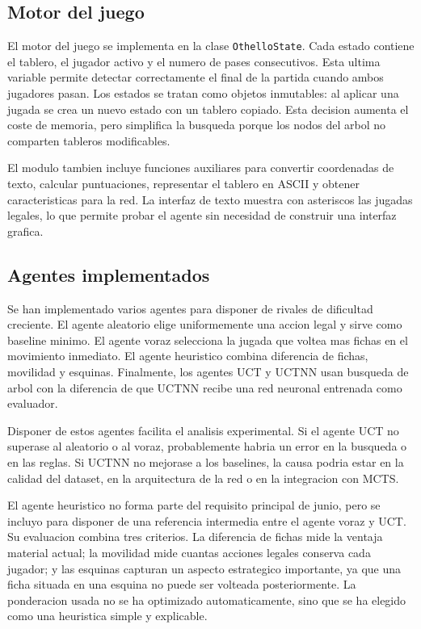 \documentclass[conference,a4paper]{IEEEtran}
\begin{document}
\subsection{Motor del juego}

El motor del juego se implementa en la clase \texttt{OthelloState}. Cada estado
contiene el tablero, el jugador activo y el numero de pases consecutivos. Esta
ultima variable permite detectar correctamente el final de la partida cuando
ambos jugadores pasan. Los estados se tratan como objetos inmutables: al aplicar
una jugada se crea un nuevo estado con un tablero copiado. Esta decision aumenta
el coste de memoria, pero simplifica la busqueda porque los nodos del arbol no
comparten tableros modificables.

El modulo tambien incluye funciones auxiliares para convertir coordenadas de
texto, calcular puntuaciones, representar el tablero en ASCII y obtener
caracteristicas para la red. La interfaz de texto muestra con asteriscos las
jugadas legales, lo que permite probar el agente sin necesidad de construir una
interfaz grafica.

\subsection{Agentes implementados}

Se han implementado varios agentes para disponer de rivales de dificultad
creciente. El agente aleatorio elige uniformemente una accion legal y sirve como
baseline minimo. El agente voraz selecciona la jugada que voltea mas fichas en
el movimiento inmediato. El agente heuristico combina diferencia de fichas,
movilidad y esquinas. Finalmente, los agentes UCT y UCTNN usan busqueda de arbol
con la diferencia de que UCTNN recibe una red neuronal entrenada como evaluador.

Disponer de estos agentes facilita el analisis experimental. Si el agente UCT no
superase al aleatorio o al voraz, probablemente habria un error en la busqueda o
en las reglas. Si UCTNN no mejorase a los baselines, la causa podria estar en la
calidad del dataset, en la arquitectura de la red o en la integracion con MCTS.

El agente heuristico no forma parte del requisito principal de junio, pero se
incluyo para disponer de una referencia intermedia entre el agente voraz y UCT.
Su evaluacion combina tres criterios. La diferencia de fichas mide la ventaja
material actual; la movilidad mide cuantas acciones legales conserva cada
jugador; y las esquinas capturan un aspecto estrategico importante, ya que una
ficha situada en una esquina no puede ser volteada posteriormente. La ponderacion
usada no se ha optimizado automaticamente, sino que se ha elegido como una
heuristica simple y explicable.
\end{document}
